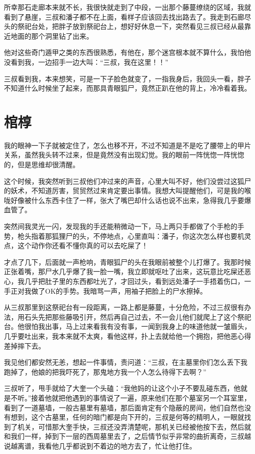 所幸那石走廊本来就不长，我很快就走到了中段，一出那个藤蔓缭绕的区域，我就看到了悬崖，三叔和潘子都不在上面，看样子应该回去找出路去了。我走到石廊尽头的祭祀台处，把胖子放到祭祀台上，想好好休息一下，突然看见三叔已经从最靠近地面的那个洞里钻了出来。

他对这些奇门遁甲之类的东西很熟悉，有他在，那个迷宫根本就不算什么，我怕他没看到我，一边招手一边大叫：“三叔，我在这里！！”

三叔看到我，本来想笑，可是一下子脸色就变了，一指我身后，我回头一看，胖子不知道什么时候坐了起来，而那具青眼狐尸，竟然正趴在他的背上，冷冷看着我。

\chapter{棺椁}

我的眼神一下子就被定住了，怎么也移不开，不过不知道是不是吃了腰带上的甲片关系，虽然我头转不过来，但是竟然没有出现幻觉。我的眼前一阵恍惚一阵恍惚的，但是思维却很清醒。

这个时候，我突然听到三叔他们冲过来的声音，心里大叫不好，他们没尝过这狐尸的妖术，不知道厉害，贸贸然过来肯定要出事情。我想大叫提醒他们，可是我的喉咙好像被什么东西卡住了一样，张大了嘴巴却什么话也说不出来，急得我几乎要爆血管了。

突然间我灵光一闪，发现我的手还能稍微动一下，马上两只手都做了个手枪的手势，枪头指着那狐狸尸的头，不停地点，心里直叫：潘子，你这次怎么样也要机灵点，这个动作你还看不懂你真的可以去吃屎了！

才点了几下，后面就一声枪响，青眼狐尸的头在我眼前被整个儿打爆了。我那时候正张着嘴，那尸水几乎爆了我一脸一嘴，我立即就呕吐了出来，这玩意比吃屎还恶心，我几乎把肚子里的东西都吐光了，才回过头，看到远处潘子一手捂着伤口，一手正对我做了OK的手势。我暗骂一声，用袖子把脸上的尸水擦掉。

从三叔那里到这祭祀台有一段距离，一路上都是藤蔓，十分危险，不过三叔很有办法，用石头先把那些藤吸引开，然后再自己过去，不一会儿他们就爬上了这个祭祀台。他很怕我出事，马上过来看我有没有事，一闻到我身上的味道他就一皱眉头，几乎要吐出来，我本来就不太爽，看他这样，扑上去就给他一个拥抱，把他恶心得差掉摔下去。

我见他们都安然无恙，想起一件事情，责问道：“三叔，在主墓里你们怎么丢下我跑掉了，他娘的把我吓死了，那鬼地方我一个人怎么待得下去啊？”

三叔听了，甩手就给了大奎一个头磕：“我他妈的让这个小子不要乱碰东西，他就是不听。”接着他就把他遇到的事情说了一遍，原来他们在那个墓室另一个耳室里，看到了一道墓墙，一般古墓里有墓墙，那后面肯定有个隐蔽的房间，他们自然也没有想到，这个古墓里，任何的暗门都是向下开的，三叔是何等的精明人，一眼就找到了机关，可惜那大奎手快，三叔还没弄清楚呢，那机关已经被他按下去，然后就和我们一样，掉到下一层的西周墓里去了，之后情节似乎非常的曲折离奇，三叔越说越离谱，我看他几乎都说到不着边的地方去了，忙让他打住。

